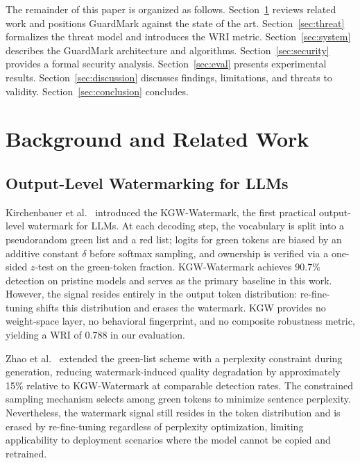 \documentclass[journal,compsoc]{IEEEtran}
\begin{document}
The remainder of this paper is organized as follows. Section~\ref{sec:background}
reviews related work and positions GuardMark against the state of the art.
Section~\ref{sec:threat} formalizes the threat model and introduces the WRI
metric. Section~\ref{sec:system} describes the GuardMark architecture and
algorithms. Section~\ref{sec:security} provides a formal security analysis.
Section~\ref{sec:eval} presents experimental results. Section~\ref{sec:discussion}
discusses findings, limitations, and threats to validity.
Section~\ref{sec:conclusion} concludes.

\section{Background and Related Work}
\label{sec:background}

\subsection{Output-Level Watermarking for LLMs}

Kirchenbauer et al.~\cite{kirchenbauer2023watermark} introduced the KGW-Watermark,
the first practical output-level watermark for LLMs. At each decoding step, the
vocabulary is split into a pseudorandom green list and a red list; logits for green
tokens are biased by an additive constant $\delta$ before softmax sampling, and
ownership is verified via a one-sided $z$-test on the green-token fraction.
KGW-Watermark achieves 90.7\% detection on pristine models and serves as the
primary baseline in this work. However, the signal resides entirely in the output
token distribution: re-fine-tuning shifts this distribution and erases the
watermark. KGW provides no weight-space layer, no behavioral fingerprint, and
no composite robustness metric, yielding a WRI of 0.788 in our evaluation.

Zhao et al.~\cite{zhao2023protecting} extended the green-list scheme with a
perplexity constraint during generation, reducing watermark-induced quality
degradation by approximately 15\% relative to KGW-Watermark at comparable
detection rates. The constrained sampling mechanism selects among green tokens
to minimize sentence perplexity. Nevertheless, the watermark signal still
resides in the token distribution and is erased by re-fine-tuning regardless
of perplexity optimization, limiting applicability to deployment scenarios
where the model cannot be copied and retrained.
\end{document}
